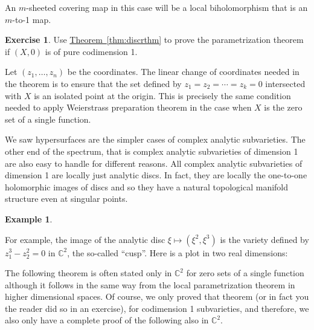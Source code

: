 \documentclass[12pt,openany]{book}
\newcommand{\C}{{\mathbb{C}}}
\theoremstyle{plain}
\theoremstyle{remark}
\theoremstyle{definition}
\newenvironment{exbox}{%
    \def\FrameCommand{\vrule width 1pt \relax\hspace {10pt}}%
    \MakeFramed {\advance \hsize -\width \FrameRestore }%
}{%
    \endMakeFramed
}
\theoremstyle{exercise}
\newtheorem{exercise}{Exercise}[section]
\theoremstyle{example}
\newtheorem{example}[thm]{Example}
\newcommand{\thmref}[1]{\hyperref[#1]{Theorem~\ref*{#1}}}
\begin{document}
An $m$-sheeted covering map in this case will be a local biholomorphism
that is an $m$-to-1 map.

\begin{exbox}
\begin{exercise}
Use \thmref{thm:discrthm}
to prove the parametrization theorem if $(X,0)$ is
of pure codimension 1.
\end{exercise}
\end{exbox}

Let $(z_1,\ldots,z_n)$ be the coordinates.
The linear change of coordinates needed in the theorem is
to ensure that the set defined by $z_1=z_2=\cdots=z_k = 0$ intersected
with $X$ is an isolated point at the origin.  This is precisely
the same condition needed to apply Weierstrass preparation theorem in the case
when $X$ is the zero set of a single function.


We saw hypersurfaces are the simpler cases of complex analytic
subvarieties.  The other end of the spectrum, that is complex analytic
subvarieties of dimension 1 are also easy to handle for different reasons.
All complex
analytic subvarieties of dimension 1 are locally just analytic discs.
In fact, they are locally the one-to-one holomorphic images of discs
and so they have a natural topological manifold structure even at singular
points.

\begin{example}
\begin{samepage}
For example, the image of the analytic disc
$\xi \mapsto (\xi^2,\xi^3)$ is the variety
defined by $z_1^3-z_2^2 = 0$ in $\C^2$, the so-called ``cusp''.  Here is a
plot in two real dimensions:

\nopagebreak
\begin{center}
\medskip

\bigskip
\end{center}
\end{samepage}
\end{example}


The following theorem is often stated only in $\C^2$ for zero sets of
a single function although it follows in
the same way from the local parametrization theorem in higher dimensional
spaces.  Of course, we only
proved that theorem (or in fact you the reader did so in an exercise), for
codimension 1 subvarieties, and therefore, we also only have a complete
proof of the following also in $\C^2$.
\end{document}
